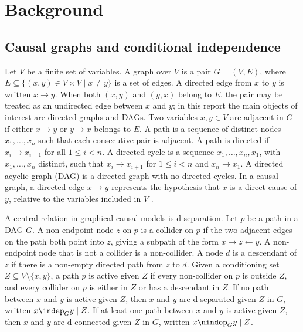 \chapter{Background}

\section{Causal graphs and conditional independence}
Let \(V\) be a finite set of variables. A graph over \(V\) is a pair \(G=(V,E)\), where \(E \subseteq \{(x,y) \in V \times V \mid x \neq y\}\) is a set of edges. A directed edge from \(x\) to \(y\) is written \(x \to y\). When both \((x,y)\) and \((y,x)\) belong to \(E\), the pair may be treated as an undirected edge between \(x\) and \(y\); in this report the main objects of interest are directed graphs and DAGs. Two variables \(x,y \in V\) are adjacent in \(G\) if either \(x \to y\) or \(y \to x\) belongs to \(E\). A path is a sequence of distinct nodes \(x_1,\ldots,x_n\) such that each consecutive pair is adjacent. A path is directed if \(x_i \to x_{i+1}\) for all \(1 \leq i < n\). A directed cycle is a sequence \(x_1,\ldots,x_n,x_1\), with \(x_1,\ldots,x_n\) distinct, such that \(x_i \to x_{i+1}\) for \(1 \leq i < n\) and \(x_n \to x_1\). A directed acyclic graph (DAG) is a directed graph with no directed cycles. In a causal graph, a directed edge \(x \to y\) represents the hypothesis that \(x\) is a direct cause of \(y\), relative to the variables included in \(V\) \cite{russo2024argumentative,glymour2019review}.

A central relation in graphical causal models is d-separation. Let \(p\) be a path in a DAG \(G\). A non-endpoint node \(z\) on \(p\) is a collider on \(p\) if the two adjacent edges on the path both point into \(z\), giving a subpath of the form \(x \to z \leftarrow y\). A non-endpoint node that is not a collider is a non-collider. A node \(d\) is a descendant of \(z\) if there is a non-empty directed path from \(z\) to \(d\). Given a conditioning set \(Z \subseteq V \setminus \{x,y\}\), a path \(p\) is active given \(Z\) if every non-collider on \(p\) is outside \(Z\), and every collider on \(p\) is either in \(Z\) or has a descendant in \(Z\). If no path between \(x\) and \(y\) is active given \(Z\), then \(x\) and \(y\) are d-separated given \(Z\) in \(G\), written \(x \indep_G y \mid Z\). If at least one path between \(x\) and \(y\) is active given \(Z\), then \(x\) and \(y\) are d-connected given \(Z\) in \(G\), written \(x \nindep_G y \mid Z\).


